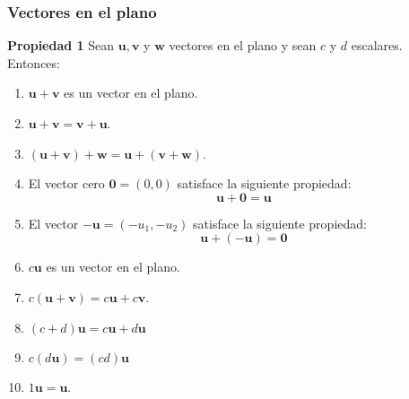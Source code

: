 {\nologo
\begin{frame}\frametitle{Vectores en el plano}

\begin{prop}{\textbf{Propiedad 1}}
	Sean $\mathbf{u}, \mathbf{v}$ y $\mathbf{w}$ vectores en el plano y sean $c$ y $d$ escalares. Entonces:
	\begin{multicols}{2}		
		\begin{enumerate}			
			\justifying
			\item $\mathbf{u}+\mathbf{v}$ es un vector en el plano. \\[4mm]			
			\item $\mathbf{u}+\mathbf{v} = \mathbf{v}+\mathbf{u}$. \\[3mm]			
			\item $(\mathbf{u}+\mathbf{v})+\mathbf{w} = \mathbf{u}+(\mathbf{v}+\mathbf{w})$. \\[4mm]			
			\item El vector cero $\mathbf{0}=(0,0)$ satisface la siguiente propiedad:
			\[
			\mathbf{u}+\mathbf{0} = \mathbf{u}
			\]
			
			\vspace{2mm}	
			\item El vector $-\mathbf{u}=(-u_1,-u_2)$ satisface la siguiente propiedad:
			\[
			\mathbf{u}+(-\mathbf{u}) = \mathbf{0}
			\]	
			\columnbreak
			\item $c\mathbf{u}$ es un vector en el plano. \\[4mm]			
			\item $c(\mathbf{u}+\mathbf{v}) = c\mathbf{u} + c\mathbf{v}$. \\[3mm]
			\item $(c+d)\mathbf{u} = c\mathbf{u} + d\mathbf{u}$ \\[4mm]
			\item $c(d\mathbf{u}) = (cd)\mathbf{u}$ \\[1.3cm]
			\item $1\mathbf{u} = \mathbf{u}$.
		\end{enumerate}		
	\end{multicols}
\end{prop}

\end{frame}
}


\subsection{}

